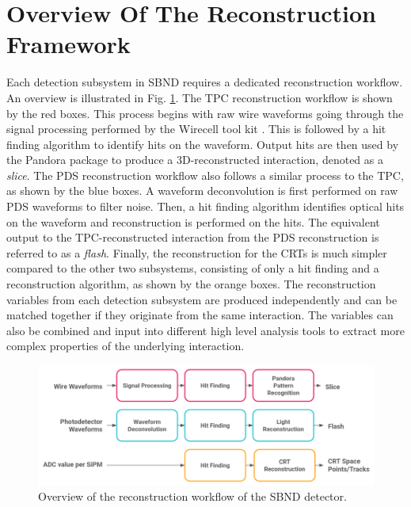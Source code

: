 \newpage


\section{Overview Of The Reconstruction Framework}
\label{sec:reco_overview}

Each detection subsystem in SBND requires a dedicated reconstruction workflow.
An overview is illustrated in Fig. \ref{fig:Reco_Workflow}.
The TPC reconstruction workflow is shown by the red boxes.
This process begins with raw wire waveforms going through the signal processing performed by the Wirecell tool kit \cite{wirecell}.
This is followed by a hit finding algorithm to identify hits on the waveform.
Output hits are then used by the Pandora package \cite{pandora} to produce a 3D-reconstructed interaction, denoted as a \textit{slice}.
The PDS reconstruction workflow also follows a similar process to the TPC, as shown by the blue boxes.
A waveform deconvolution is first performed on raw PDS waveforms to filter noise.
Then, a hit finding algorithm identifies optical hits on the waveform and reconstruction is performed on the hits.
The equivalent output to the TPC-reconstructed interaction from the PDS reconstruction is referred to as a \textit{flash}.
Finally, the reconstruction for the CRTs is much simpler compared to the other two subsystems, consisting of only a hit finding and a reconstruction algorithm, as shown by the orange boxes.
The reconstruction variables from each detection subsystem are produced independently and can be matched together if they originate from the same interaction. 
The variables can also be combined and input into different high level analysis tools to extract more complex properties of the underlying interaction. 

\begin{figure}[htbp!] 
\centering    
\includegraphics[width=1.0\textwidth]{Reco_Workflow}
\caption[Reconstruction Framework of SBND]{
Overview of the reconstruction workflow of the SBND detector.
}
\label{fig:Reco_Workflow}
\end{figure}

